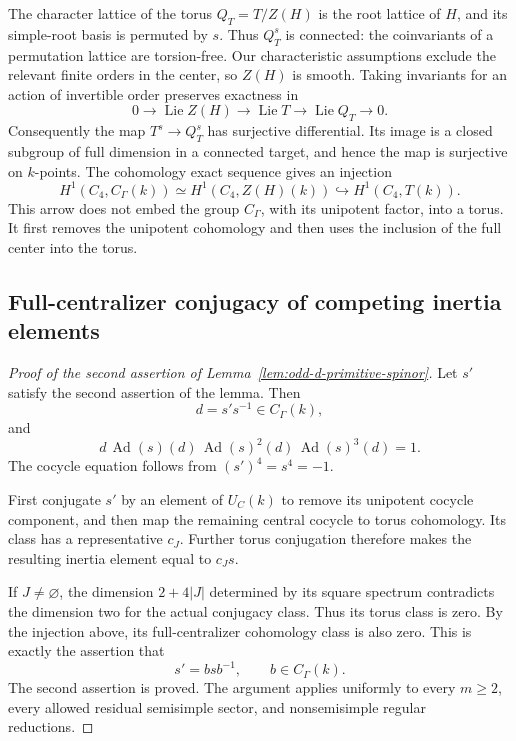 \documentclass[11pt,a4paper]{article}
\theoremstyle{definition}
\theoremstyle{remark}
\begin{document}
The character lattice of the torus \(Q_T=T/Z(H)\) is the root lattice
of \(H\), and its simple-root basis is permuted by \(s\).
Thus \(Q_T^s\) is connected: the coinvariants of a permutation lattice
are torsion-free.
Our characteristic assumptions exclude the relevant finite orders in
the center, so \(Z(H)\) is smooth.
Taking invariants for an action of invertible order preserves exactness
in
\[
0\longrightarrow\operatorname{Lie}Z(H)
\longrightarrow\operatorname{Lie}T
\longrightarrow\operatorname{Lie}Q_T
\longrightarrow0.
\]
Consequently the map \(T^s\to Q_T^s\) has surjective differential.
Its image is a closed subgroup of full dimension in a connected
target, and hence the map is surjective on \(k\)-points.
The cohomology exact sequence gives an injection
\[
H^1(C_4,C_\Gamma(k))
\simeq H^1(C_4,Z(H)(k))
\hookrightarrow H^1(C_4,T(k)).
\]
This arrow does not embed the group \(C_\Gamma\), with its unipotent
factor, into a torus.
It first removes the unipotent cohomology and then uses the inclusion
of the full center into the torus.

\subsection{Full-centralizer conjugacy of competing inertia elements}

\begin{proof}[Proof of the second assertion of
Lemma~\ref{lem:odd-d-primitive-spinor}]
Let \(s'\) satisfy the second assertion of the lemma.
Then
\[
d=s's^{-1}\in C_\Gamma(k),
\]
and
\[
d\,\operatorname{Ad}(s)(d)\,
\operatorname{Ad}(s)^2(d)\,
\operatorname{Ad}(s)^3(d)=1.
\]
The cocycle equation follows from \((s')^4=s^4=-1\).

First conjugate \(s'\) by an element of \(U_C(k)\) to remove its
unipotent cocycle component, and then map the remaining central
cocycle to torus cohomology.
Its class has a representative \(c_J\).
Further torus conjugation therefore makes the resulting inertia
element equal to \(c_Js\).

If \(J\ne\varnothing\), the dimension \(2+4|J|\) determined by its square
spectrum contradicts the dimension two for the actual conjugacy class.
Thus its torus class is zero.
By the injection above, its full-centralizer cohomology class is also
zero.  This is exactly the assertion that
\[
s'=bsb^{-1},\qquad b\in C_\Gamma(k).
\]
The second assertion is proved.
The argument applies uniformly to every \(m\geq2\), every allowed
residual semisimple sector, and nonsemisimple regular reductions.
\end{proof}
\end{document}
